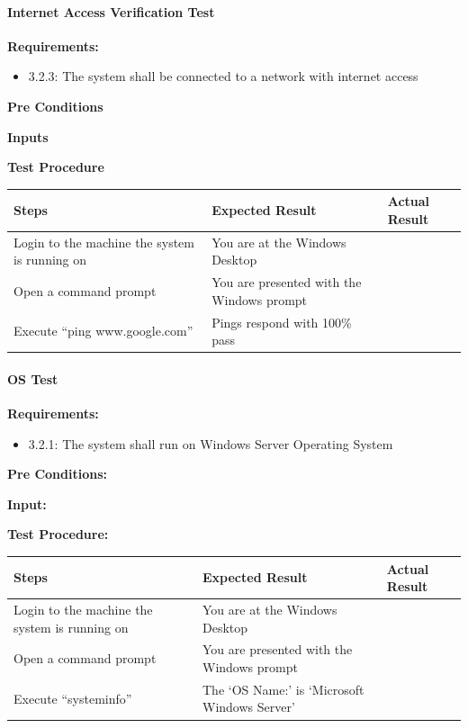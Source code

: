 \documentclass[letterpaper,10pt,english]{sphinxmanual}
\begin{document}
\paragraph{Internet Access Verification Test}
\label{STD/manual_test_descriptions:internet-access-verification-test}
\textbf{Requirements:}
\begin{itemize}
\item {} 
3.2.3: The system shall be connected to a network with internet access

\end{itemize}

\textbf{Pre Conditions}

\textbf{Inputs}

\textbf{Test Procedure}

\begin{tabulary}{\linewidth}{|L|L|L|}
\hline
\textsf{\relax 
Steps
} & \textsf{\relax 
Expected Result
} & \textsf{\relax 
Actual Result
}\\
\hline
Login to the machine the system is running on
 & 
You are at the Windows Desktop
 & \\
\hline
Open a command prompt
 & 
You are presented with the Windows prompt
 & \\
\hline
Execute ``ping www.google.com''
 & 
Pings respond with 100\% pass
 & \\
\hline\end{tabulary}



\paragraph{OS Test}
\label{STD/manual_test_descriptions:os-test}
\textbf{Requirements:}
\begin{itemize}
\item {} 
3.2.1: The system shall run on Windows Server Operating System

\end{itemize}

\textbf{Pre Conditions:}

\textbf{Input:}

\textbf{Test Procedure:}

\begin{tabulary}{\linewidth}{|L|L|L|}
\hline
\textsf{\relax 
Steps
} & \textsf{\relax 
Expected Result
} & \textsf{\relax 
Actual Result
}\\
\hline
Login to the machine the system is running on
 & 
You are at the Windows Desktop
 & \\
\hline
Open a command prompt
 & 
You are presented with the Windows prompt
 & \\
\hline
Execute ``systeminfo''
 & 
The `OS Name:' is `Microsoft Windows Server'
 & \\
\hline\end{tabulary}
\end{document}
